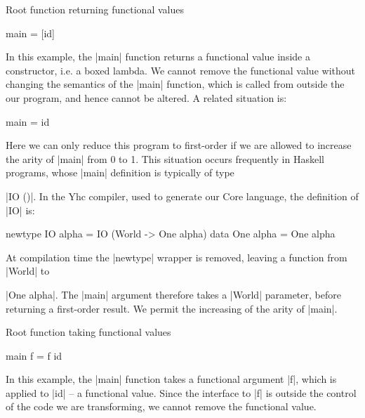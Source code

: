 \documentclass[preprint]{sigplanconf}
\begin{document}
\begin{examplename}{Root function returning functional values}
\label{ex:root_function_functional}
\begin{code}
main = [id]
\end{code}

In this example, the |main| function returns a functional value inside a constructor, i.e. a boxed lambda. We cannot remove the functional value without changing the semantics of the |main| function, which is called from outside the our program, and hence cannot be altered. A related situation is:

\begin{code}
main = id
\end{code}

Here we can only reduce this program to first-order if we are allowed to increase the arity of |main| from 0 to 1. This situation occurs frequently in Haskell programs, whose |main| definition is typically of type \ignore|IO ()|. In the Yhc compiler, used to generate our Core language, the definition of |IO| is:

\begin{code}
newtype IO alpha = IO (World -> One alpha)
data One alpha = One alpha
\end{code}

At compilation time the |newtype| wrapper is removed, leaving a function from |World| to \ignore|One alpha|. The |main| argument therefore takes a |World| parameter, before returning a first-order result. We permit the increasing of the arity of |main|.
\end{examplename}

\begin{examplename}{Root function taking functional values}
\begin{code}
main f = f id
\end{code}

In this example, the |main| function takes a functional argument |f|, which is applied to |id| -- a functional value. Since the interface to |f| is outside the control of the code we are transforming, we cannot remove the functional value.
\end{examplename}
\end{document}
